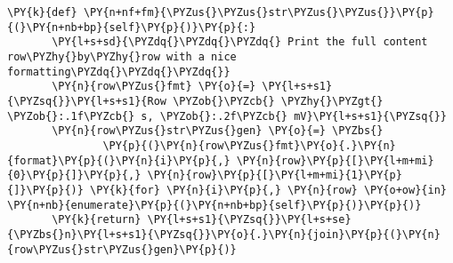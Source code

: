 \begin{Verbatim}[label=\makebox{\url{https://github.com/lucabaldini/cmepda/tree/master/slides/latex/snippets/voltage\_data\_2.py}},commandchars=\\\{\}]
   \PY{k}{def} \PY{n+nf+fm}{\PYZus{}\PYZus{}str\PYZus{}\PYZus{}}\PY{p}{(}\PY{n+nb+bp}{self}\PY{p}{)}\PY{p}{:}
       \PY{l+s+sd}{\PYZdq{}\PYZdq{}\PYZdq{} Print the full content row\PYZhy{}by\PYZhy{}row with a nice formatting\PYZdq{}\PYZdq{}\PYZdq{}}
       \PY{n}{row\PYZus{}fmt} \PY{o}{=} \PY{l+s+s1}{\PYZsq{}}\PY{l+s+s1}{Row \PYZob{}\PYZcb{} \PYZhy{}\PYZgt{} \PYZob{}:.1f\PYZcb{} s, \PYZob{}:.2f\PYZcb{} mV}\PY{l+s+s1}{\PYZsq{}}
       \PY{n}{row\PYZus{}str\PYZus{}gen} \PY{o}{=} \PYZbs{}
               \PY{p}{(}\PY{n}{row\PYZus{}fmt}\PY{o}{.}\PY{n}{format}\PY{p}{(}\PY{n}{i}\PY{p}{,} \PY{n}{row}\PY{p}{[}\PY{l+m+mi}{0}\PY{p}{]}\PY{p}{,} \PY{n}{row}\PY{p}{[}\PY{l+m+mi}{1}\PY{p}{]}\PY{p}{)} \PY{k}{for} \PY{n}{i}\PY{p}{,} \PY{n}{row} \PY{o+ow}{in} \PY{n+nb}{enumerate}\PY{p}{(}\PY{n+nb+bp}{self}\PY{p}{)}\PY{p}{)}
       \PY{k}{return} \PY{l+s+s1}{\PYZsq{}}\PY{l+s+se}{\PYZbs{}n}\PY{l+s+s1}{\PYZsq{}}\PY{o}{.}\PY{n}{join}\PY{p}{(}\PY{n}{row\PYZus{}str\PYZus{}gen}\PY{p}{)}
\end{Verbatim}